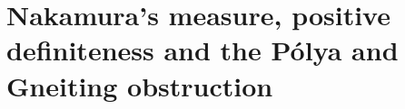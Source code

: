 \chapter{Nakamura's measure, positive definiteness and the P\'olya and Gneiting obstruction}\label{vol3:ch4}

